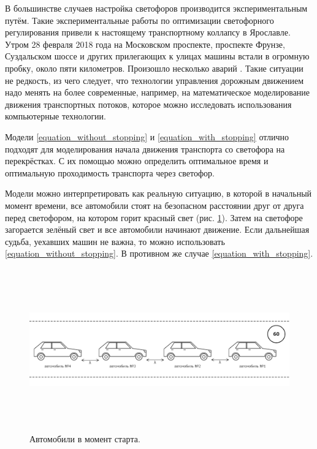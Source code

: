 \documentclass[12pt, a4paper]{extarticle}
\numberwithin{equation}{section}
\begin{document}
В большинстве случаев настройка светофоров производится экспериментальным путём. Такие экспериментальные 
работы по оптимизации светофорного регулирования привели к настоящему транспортному коллапсу в Ярославле.
Утром 28 февраля 2018 года на Московском проспекте, проспекте Фрунзе, Суздальском шоссе и других прилегающих к улицах машины встали в огромную пробку, около пяти километров. Произошло несколько аварий \cite{News}. Такие ситуации не редкость, из чего следует, что технологии управления дорожным движением надо менять на более современные, например, на математическое моделирование движения транспортных потоков, которое можно исследовать использования компьютерные технологии. 

Модели \eqref{equation_without_stopping} и \eqref{equation_with_stopping} отлично подходят для моделирования начала движения транспорта со светофора на перекрёстках. С их помощью можно определить оптимальное время и оптимальную проходимость транспорта через светофор. 

Модели можно интерпретировать как реальную ситуацию, в которой в начальный момент времени, все автомобили стоят на безопасном расстоянии друг от друга перед светофором, на котором горит красный свет (рис. \ref{car's_start_position}). Затем на светофоре загорается зелёный свет и все автомобили начинают движение. Если дальнейшая судьба, уехавших машин не важна, то можно использовать \eqref{equation_without_stopping}. В противном же случае  \eqref{equation_with_stopping}.

\begin{figure}[h!]  
	\begin{center}
		\includegraphics[keepaspectratio,width=160mm,height=70mm]{Images/car's_start_position.png}
	\end{center}
	\caption{Автомобили в момент старта.}
	\label{car's_start_position}
\end{figure}
\end{document}
